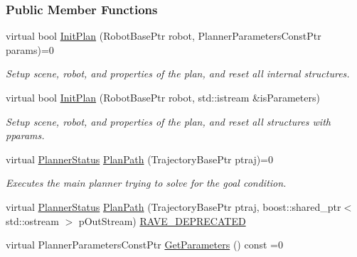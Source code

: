 \subsubsection*{Public Member Functions}
\begin{DoxyCompactItemize}
\item 
virtual bool \hyperlink{classOpenRAVE_1_1PlannerBase_a109c37d3de7ee99f93c740a2df0e5e34}{InitPlan} (RobotBasePtr robot, PlannerParametersConstPtr params)=0
\begin{DoxyCompactList}\small\item\em Setup scene, robot, and properties of the plan, and reset all internal structures. \item\end{DoxyCompactList}\item 
virtual bool \hyperlink{classOpenRAVE_1_1PlannerBase_ac1d85f92b0e42d911c1cab6db2c90b61}{InitPlan} (RobotBasePtr robot, std::istream \&isParameters)
\begin{DoxyCompactList}\small\item\em Setup scene, robot, and properties of the plan, and reset all structures with pparams. \item\end{DoxyCompactList}\item 
virtual \hyperlink{namespaceOpenRAVE_a7cead738b92cbe2f332dea20dd2f200e}{PlannerStatus} \hyperlink{classOpenRAVE_1_1PlannerBase_a7ce22311b1f81ec6b9bacdf457d4631a}{PlanPath} (TrajectoryBasePtr ptraj)=0
\begin{DoxyCompactList}\small\item\em Executes the main planner trying to solve for the goal condition. \item\end{DoxyCompactList}\item 
virtual \hyperlink{namespaceOpenRAVE_a7cead738b92cbe2f332dea20dd2f200e}{PlannerStatus} \hyperlink{classOpenRAVE_1_1PlannerBase_a9ec338cf4116a2bf8b874cde2aa28967}{PlanPath} (TrajectoryBasePtr ptraj, boost::shared\_\-ptr$<$ std::ostream $>$ pOutStream) \hyperlink{namespaceOpenRAVE_af23fc4c2c72950a8c02f38ef71680bc6}{RAVE\_\-DEPRECATED}
\item 
\hypertarget{classOpenRAVE_1_1PlannerBase_a2d4fa4877d4f75fc207f1e8243b647dc}{
virtual PlannerParametersConstPtr \hyperlink{classOpenRAVE_1_1PlannerBase_a2d4fa4877d4f75fc207f1e8243b647dc}{GetParameters} () const =0}
\label{classOpenRAVE_1_1PlannerBase_a2d4fa4877d4f75fc207f1e8243b647dc}


\end{DoxyCompactItemize}
